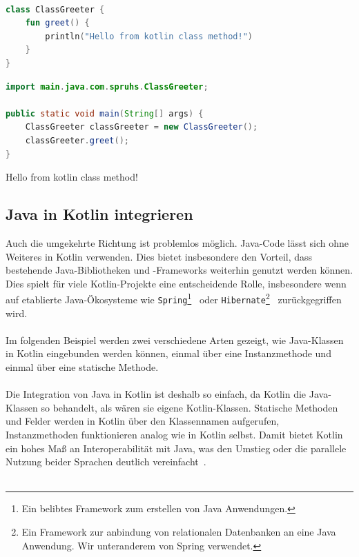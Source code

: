 \documentclass[11pt]{article}
\begin{document}
    \begin{lstlisting}[language=Kotlin, caption={KotlinGreeter.kt}]

class ClassGreeter {
    fun greet() {
        println("Hello from kotlin class method!")
    }
}
    \end{lstlisting}

    \begin{lstlisting}[language=Java, caption={Main.java}]
import main.java.com.spruhs.ClassGreeter;

public static void main(String[] args) {
    ClassGreeter classGreeter = new ClassGreeter();
    classGreeter.greet();
}
    \end{lstlisting}

    \begin{tcolorbox}[colback=black!5!white, colframe=black, title=Ausgabe]
        Hello from kotlin class method!\\
    \end{tcolorbox}
    
    \subsection{Java in Kotlin integrieren}
    Auch die umgekehrte Richtung ist problemlos möglich.
    Java-Code lässt sich ohne Weiteres in Kotlin verwenden.
    Dies bietet insbesondere den Vorteil, dass bestehende Java-Bibliotheken und -Frameworks weiterhin genutzt werden können.
    Dies spielt für viele Kotlin-Projekte eine entscheidende Rolle, insbesondere wenn auf etablierte Java-Ökosysteme wie \texttt{Spring}\footnote{Ein belibtes Framework zum erstellen von Java Anwendungen.}~\cite{spring} oder \texttt{Hibernate}\footnote{Ein Framework zur anbindung von relationalen Datenbanken an eine Java Anwendung. Wir unteranderem von Spring verwendet.}~\cite{hibernate} zurückgegriffen wird.\\
    \\
    Im folgenden Beispiel werden zwei verschiedene Arten gezeigt, wie Java-Klassen in Kotlin eingebunden werden können, einmal über eine Instanzmethode und einmal über eine statische Methode.\\
    \\
    Die Integration von Java in Kotlin ist deshalb so einfach, da Kotlin die Java-Klassen so behandelt, als wären sie eigene Kotlin-Klassen.
    Statische Methoden und Felder werden in Kotlin über den Klassennamen aufgerufen, Instanzmethoden funktionieren analog wie in Kotlin selbst.
    Damit bietet Kotlin ein hohes Maß an Interoperabilität mit Java, was den Umstieg oder die parallele Nutzung beider Sprachen deutlich vereinfacht~\cite{kotlin-java-in-kotlin}.\\
    \\
\end{document}
